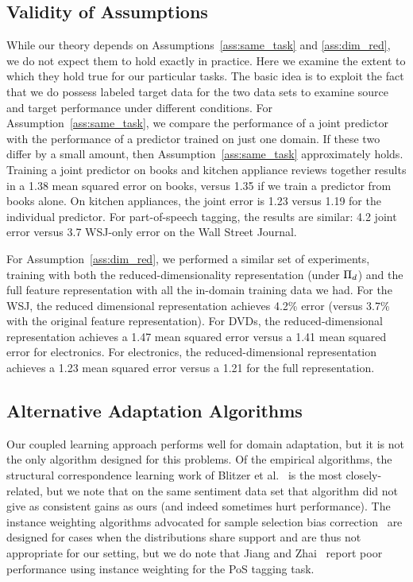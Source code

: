 \subsection{Validity of Assumptions}

While our theory depends on Assumptions~\ref{ass:same_task} and
\ref{ass:dim_red}, we do not expect them to hold exactly in practice.
Here we examine the extent to which they hold true for our particular
tasks.  The basic idea is to exploit the fact that we do possess
labeled target data for the two data sets to examine source and target
performance under different conditions.  For
Assumption~\ref{ass:same_task}, we compare the performance of a joint
predictor with the performance of a predictor trained on just one
domain.  If these two differ by a small amount, then
Assumption~\ref{ass:same_task} approximately holds.  Training a joint
predictor on books and kitchen appliance reviews together results in a
1.38 mean squared error on books, versus 1.35 if we train a predictor
from books alone.  On kitchen appliances, the joint error is 1.23
versus 1.19 for the individual predictor.  For part-of-speech tagging,
the results are similar: 4.2 joint error versus 3.7 WSJ-only error on
the Wall Street Journal.

For Assumption~\ref{ass:dim_red}, we performed a similar set of
experiments, training with both the reduced-dimensionality
representation (under $\Pi_d$) and the full feature representation
with all the in-domain training data we had.  For the WSJ, the reduced
dimensional representation achieves 4.2\% error (versus 3.7\% with the
original feature representation).  For DVDs, the reduced-dimensional
representation achieves a 1.47 mean squared error versus a 1.41 mean
squared error for electronics.  For electronics, the
reduced-dimensional representation achieves a 1.23 mean squared error
versus a 1.21 for the full representation.

\subsection{Alternative Adaptation Algorithms}
\label{subsec:other}

Our coupled learning approach performs well for domain adaptation, but
it is not the only algorithm designed for this problems.  Of the
empirical algorithms, the structural correspondence learning work of
Blitzer et al.~\cite{blitzer06} is the most closely-related, but we
note that on the same sentiment data set that algorithm did not give
as consistent gains as ours (and indeed sometimes hurt performance).
The instance weighting algorithms advocated for sample selection bias
correction~\cite{huang07,cortes08} are designed for cases when the
distributions share support and are thus not appropriate for our
setting, but we do note that Jiang and Zhai~\cite{jiang07} report poor
performance using instance weighting for the PoS tagging task.  

